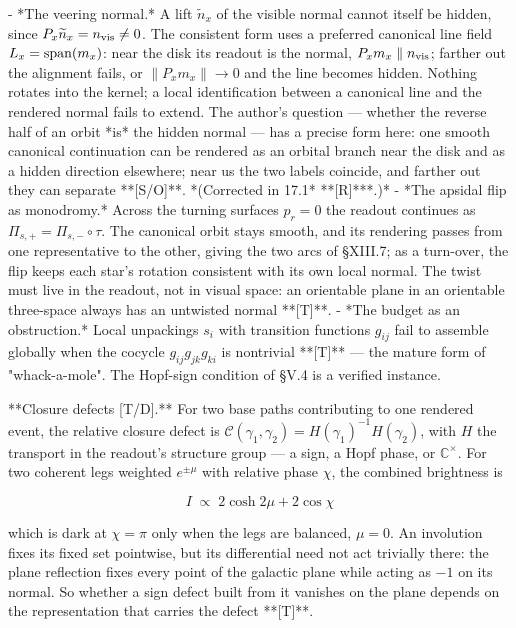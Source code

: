 - *The veering normal.* A lift $\widetilde n_x$ of the visible normal cannot itself be hidden, since $P_x\widetilde n_x = n_{\rm vis}\neq0$. The consistent form uses a preferred canonical line field $L_x = {\rm span}(m_x)$: near the disk its readout is the normal, $P_xm_x\parallel n_{\rm vis}$; farther out the alignment fails, or $\|P_xm_x\|\to0$ and the line becomes hidden. Nothing rotates into the kernel; a local identification between a canonical line and the rendered normal fails to extend. The author's question — whether the reverse half of an orbit *is* the hidden normal — has a precise form here: one smooth canonical continuation can be rendered as an orbital branch near the disk and as a hidden direction elsewhere; near us the two labels coincide, and farther out they can separate **[S/O]**. *(Corrected in 17.1* **[R]***.)*
- *The apsidal flip as monodromy.* Across the turning surfaces $p_r = 0$ the readout continues as $\Pi_{s,+} = \Pi_{s,-}\circ\tau$. The canonical orbit stays smooth, and its rendering passes from one representative to the other, giving the two arcs of §XIII.7; as a turn-over, the flip keeps each star's rotation consistent with its own local normal. The twist must live in the readout, not in visual space: an orientable plane in an orientable three-space always has an untwisted normal **[T]**.
- *The budget as an obstruction.* Local unpackings $s_i$ with transition functions $g_{ij}$ fail to assemble globally when the cocycle $g_{ij}g_{jk}g_{ki}$ is nontrivial **[T]** — the mature form of "whack-a-mole". The Hopf-sign condition of §V.4 is a verified instance.

**Closure defects [T/D].** For two base paths contributing to one rendered event, the relative closure defect is $\mathcal C(\gamma_1,\gamma_2) = H(\gamma_1)^{-1}H(\gamma_2)$, with $H$ the transport in the readout's structure group — a sign, a Hopf phase, or $\mathbb{C}^\times$. For two coherent legs weighted $e^{\pm\mu}$ with relative phase $\chi$, the combined brightness is

$$I\;\propto\;2\cosh2\mu+2\cos\chi$$

which is dark at $\chi = \pi$ only when the legs are balanced, $\mu = 0$. An involution fixes its fixed set pointwise, but its differential need not act trivially there: the plane reflection fixes every point of the galactic plane while acting as $-1$ on its normal. So whether a sign defect built from it vanishes on the plane depends on the representation that carries the defect **[T]**.

